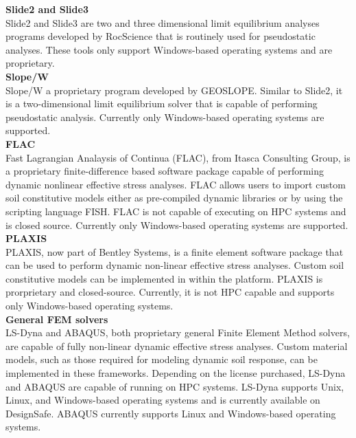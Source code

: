 \noindent\textbf{Slide2 and Slide3}\\
Slide2 and Slide3 are two and three dimensional limit equilibrium analyses programs developed by RocScience that is routinely used for pseudostatic analyses. These tools only support Windows-based operating systems and are proprietary.\\

\noindent\textbf{Slope/W}\\
Slope/W a proprietary program developed by GEOSLOPE. Similar to Slide2, it is a two-dimensional limit equilibrium solver that is capable of performing pseudostatic analysis. Currently only Windows-based operating systems are supported.\\

\noindent\textbf{FLAC}\\
Fast Lagrangian Analaysis of Continua (FLAC), from Itasca Consulting Group, is a proprietary finite-difference based software package capable of performing dynamic nonlinear effective stress analyses. FLAC allows users to import custom soil constitutive models either as pre-compiled dynamic libraries or by using the scripting language FISH. FLAC is not capable of executing on HPC systems and is closed source. Currently only Windows-based operating systems are supported.\\

\noindent\textbf{PLAXIS}\\
PLAXIS, now part of Bentley Systems, is a finite element software package that can be used to perform dynamic non-linear effective stress analyses. Custom soil constitutive models can be implemented in within the platform. PLAXIS is prorprietary and closed-source. Currently, it is not HPC capable and supports only Windows-based operating systems.\\

\noindent\textbf{General FEM solvers}\\
LS-Dyna and ABAQUS, both proprietary general Finite Element Method solvers, are capable of fully non-linear dynamic effective stress analyses. Custom material models, such as those required for modeling dynamic soil response, can be implemented in these frameworks. Depending on the license purchased, LS-Dyna and ABAQUS are capable of running on HPC systems. LS-Dyna supports Unix, Linux, and Windows-based operating systems and is currently available on DesignSafe. ABAQUS currently supports Linux and Windows-based operating systems.\\


